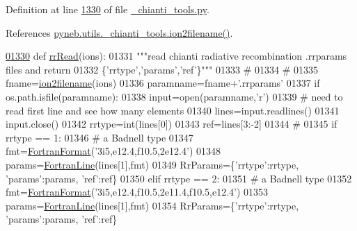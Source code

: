 Definition at line \hyperlink{__chianti__tools_8py_source_l01330}{1330} of file \hyperlink{__chianti__tools_8py_source}{\+\_\+chianti\+\_\+tools.\+py}.



References \hyperlink{__chianti__tools_8py_source_l00396}{pyneb.\+utils.\+\_\+chianti\+\_\+tools.\+ion2filename()}.


\begin{DoxyCode}
\hypertarget{namespacepyneb_1_1utils_1_1__chianti__tools_l01330}{}\hyperlink{namespacepyneb_1_1utils_1_1__chianti__tools_a71865c846f3d3b1c9b1371c6779c8f3e}{01330} \textcolor{keyword}{def }\hyperlink{namespacepyneb_1_1utils_1_1__chianti__tools_a71865c846f3d3b1c9b1371c6779c8f3e}{rrRead}(ions):
01331     \textcolor{stringliteral}{"""read chianti radiative recombination .rrparams files and return}
01332 \textcolor{stringliteral}{        \{'rrtype','params','ref'\}"""}
01333     \textcolor{comment}{#}
01334     \textcolor{comment}{#}
01335     fname=\hyperlink{namespacepyneb_1_1utils_1_1__chianti__tools_ad4bc7b577fd4c3819ceb00b0a444351b}{ion2filename}(ions)
01336     paramname=fname+\textcolor{stringliteral}{'.rrparams'}
01337     \textcolor{keywordflow}{if} os.path.isfile(paramname):
01338         input=open(paramname,\textcolor{stringliteral}{'}\textcolor{stringliteral}{r')}
01339 \textcolor{stringliteral}{        }\textcolor{comment}{#  need to read first line and see how many elements}
01340         lines=input.readlines()
01341         input.close()
01342         rrtype=int(lines[0])
01343         ref=lines[3:-2]
01344         \textcolor{comment}{#}
01345         \textcolor{keywordflow}{if} rrtype == 1:
01346             \textcolor{comment}{# a Badnell type}
01347             fmt=\hyperlink{classpyneb_1_1utils_1_1_fortran_format_1_1_fortran_format}{FortranFormat}(\textcolor{stringliteral}{'3i5,e12.4,f10.5,2e12.4'})
01348             params=\hyperlink{classpyneb_1_1utils_1_1_fortran_format_1_1_fortran_line}{FortranLine}(lines[1],fmt)
01349             RrParams=\{\textcolor{stringliteral}{'rrtype'}:rrtype, \textcolor{stringliteral}{'params'}:params, \textcolor{stringliteral}{'ref'}:ref\}
01350         \textcolor{keywordflow}{elif} rrtype == 2:
01351             \textcolor{comment}{# a Badnell type}
01352             fmt=\hyperlink{classpyneb_1_1utils_1_1_fortran_format_1_1_fortran_format}{FortranFormat}(\textcolor{stringliteral}{'3i5,e12.4,f10.5,2e11.4,f10.5,e12.4'})
01353             params=\hyperlink{classpyneb_1_1utils_1_1_fortran_format_1_1_fortran_line}{FortranLine}(lines[1],fmt)
01354             RrParams=\{\textcolor{stringliteral}{'rrtype'}:rrtype, \textcolor{stringliteral}{'params'}:params, \textcolor{stringliteral}{'ref'}:ref\}

\end{DoxyCode}
